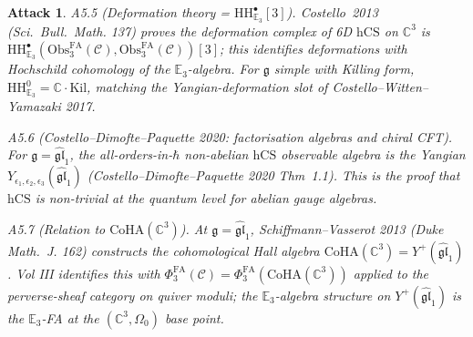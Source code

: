 \documentclass[11pt]{article}
\newtheorem*{attack}{Attack}
\theoremstyle{definition}
\providecommand{\CC}{\mathbb{C}}
\providecommand{\HH}{\mathrm{HH}}
\providecommand{\fg}{\mathfrak{g}}
\providecommand{\hbarb}{\hbar}
\providecommand{\cC}{\mathcal{C}}
\providecommand{\Obs}{\mathrm{Obs}}
\providecommand{\hCS}{\mathrm{hCS}}
\providecommand{\FA}{\mathrm{FA}}
\providecommand{\CoHA}{\mathrm{CoHA}}
\begin{document}
\begin{attack}
\emph{A5.5 (Deformation theory = $\HH^\bullet_{\mathbb{E}_3}[3]$).}
Costello~2013 (\emph{Sci.~Bull.~Math.} 137) proves the deformation
complex of 6D $\hCS$ on $\CC^3$ is
$\HH^\bullet_{\mathbb{E}_3}(\Obs^{\FA}_3(\cC), \Obs^{\FA}_3(\cC))[3]$;
this identifies deformations with Hochschild cohomology of the
$\mathbb{E}_3$-algebra. For $\fg$ simple with Killing form,
$\HH^0_{\mathbb{E}_3} = \CC \cdot \mathrm{Kil}$, matching the
Yangian-deformation slot of Costello--Witten--Yamazaki 2017.

\emph{A5.6 (Costello--Dimofte--Paquette 2020: factorisation algebras
and chiral CFT).} For $\fg = \widehat{\mathfrak{gl}}_1$, the
all-orders-in-$\hbarb$ non-abelian $\hCS$ observable algebra is the
Yangian $Y_{\epsilon_1,\epsilon_2,\epsilon_3}(\widehat{\mathfrak{gl}}_1)$
(Costello--Dimofte--Paquette 2020 Thm~1.1). This is the proof that
$\hCS$ is non-trivial at the quantum level for abelian gauge algebras.

\emph{A5.7 (Relation to $\CoHA(\CC^3)$).} At $\fg = \widehat{\mathfrak{gl}}_1$,
Schiffmann--Vasserot 2013 (\emph{Duke Math.~J.} 162) constructs the
cohomological Hall algebra $\CoHA(\CC^3) = Y^+(\widehat{\mathfrak{gl}}_1)$.
Vol III identifies this with $\Phi^{\FA}_3(\cC) = \Phi^{\FA}_3(\CoHA(\CC^3))$
applied to the perverse-sheaf category on quiver moduli; the
$\mathbb{E}_3$-algebra structure on $Y^+(\widehat{\mathfrak{gl}}_1)$
\emph{is} the $\mathbb{E}_3$-FA at the $(\CC^3, \Omega_0)$ base point.
\end{attack}
\end{document}
